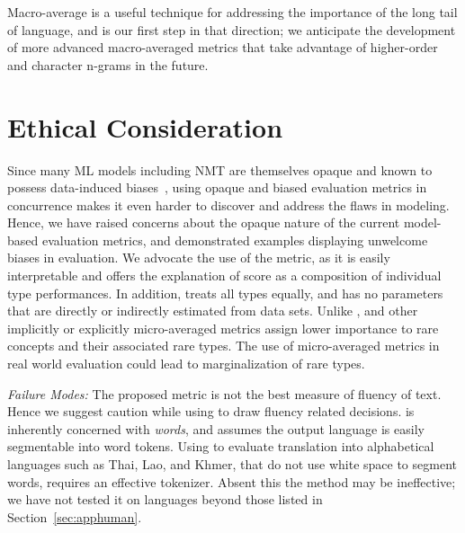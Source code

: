 Macro-average is a useful technique for addressing the importance of the long tail of language, and  is our first step in that direction; we anticipate the development of more advanced macro-averaged metrics that take advantage of higher-order and character n-grams in the future. 






\section*{Ethical Consideration}
Since many ML models including NMT are themselves opaque and known to possess data-induced biases~\cite{prates2019-mt-bias}, using opaque and biased evaluation metrics in concurrence makes it even harder to discover and address the flaws in modeling.
Hence, we have raised concerns about the opaque nature of the current model-based evaluation metrics, and demonstrated examples displaying unwelcome biases in evaluation. We advocate the use of the  metric, as it is easily interpretable and offers the explanation of score as a composition of individual type performances.
In addition,  treats all types equally, and has no parameters that are directly or indirectly estimated from data sets. Unlike ,  and other implicitly or explicitly micro-averaged metrics assign lower importance to rare concepts and their associated rare types. 
The use of micro-averaged metrics in real world evaluation could lead to marginalization of rare types.

\textit{Failure Modes:}
The proposed  metric is not the best measure of fluency of text. 
Hence we suggest caution while using  to draw fluency related decisions.  is inherently concerned with \textit{words}, and assumes the output language is easily segmentable into word tokens. Using  to evaluate translation into alphabetical languages such as Thai, Lao, and Khmer, that do not use white space to segment words, requires an effective tokenizer. Absent this the method may be ineffective; we have not tested it on languages beyond those listed in Section~\ref{sec:apphuman}.

